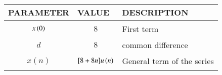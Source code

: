 \begin{tabular}{|p{2cm}|p{2.5cm}|p{2.3cm}|}
    \hline
    PARAMETER & VALUE & DESCRIPTION  \\ \hline
    $$x\left(0\right)$$ & $$8$$ & First term \\ \hline
    $$d$$ & $$8$$ & common difference \\ \hline
    $$x(n)$$ & $$[8+8n]u\left(n\right)$$ & General term of the series  \\ 
    \hline
  \end{tabular}
